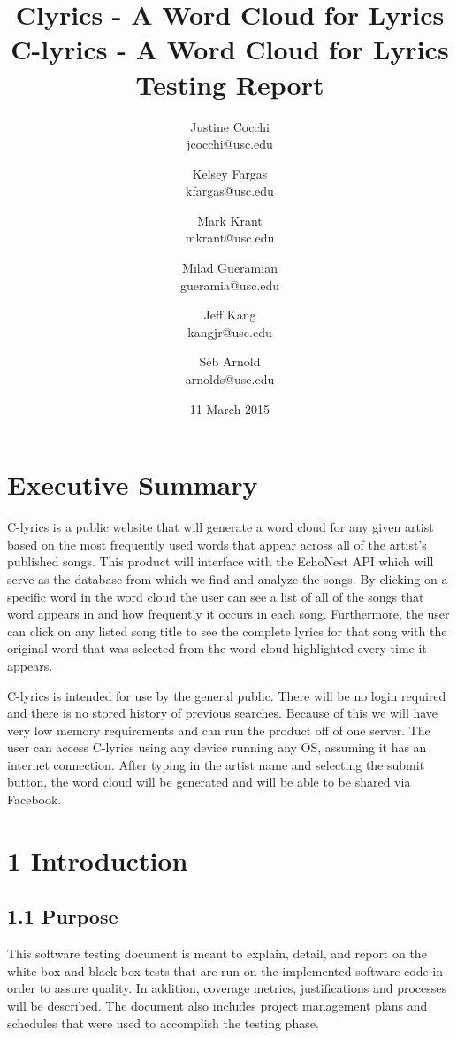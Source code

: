 \documentclass[]{article}
\title{Clyrics - A Word Cloud for Lyrics}
\author{Justine Cocchi\\jcocchi@usc.edu \and Kelsey Fargas\\kfargas@usc.edu \and Mark Krant \\ mkrant@usc.edu\and Milad Gueramian\\gueramia@usc.edu \and Jeff Kang\\kangjr@usc.edu \and Séb Arnold\\arnolds@usc.edu}
\date{11 March 2015}
\title{%
	C-lyrics - A Word Cloud for Lyrics \\
	\large Testing Report}
\begin{document}
\clearpage\maketitle
\thispagestyle{empty}

\pagebreak

\tableofcontents
\setcounter{tocdepth}{4}
\thispagestyle{empty}

\pagebreak

\section{\textbf{Executive Summary}}\label{executive-summary}

C-lyrics is a public website that will generate a word cloud for any
given artist based on the most frequently used words that appear across
all of the artist's published songs. This product will interface with
the EchoNest API which will serve as the database from which we find and
analyze the songs. By clicking on a specific word in the word cloud the
user can see a list of all of the songs that word appears in and how
frequently it occurs in each song. Furthermore, the user can click on
any listed song title to see the complete lyrics for that song with the
original word that was selected from the word cloud highlighted every
time it appears.

C-lyrics is intended for use by the general public. There will be no
login required and there is no stored history of previous searches.
Because of this we will have very low memory requirements and can run
the product off of one server. The user can access C-lyrics using any
device running any OS, assuming it has an internet connection. After
typing in the artist name and selecting the submit button, the word
cloud will be generated and will be able to be shared via Facebook.

\pagebreak

\section{\textbf{1 Introduction}}\label{introduction}

\subsection{\textbf{1.1 Purpose }}\label{purpose}

This software testing document is meant to explain, detail, and report
on the white-box and black box tests that are run on the implemented
software code in order to assure quality. In addition, coverage metrics,
justifications and processes will be described. The document also
includes project management plans and schedules that were used to
accomplish the testing phase.
\end{document}
